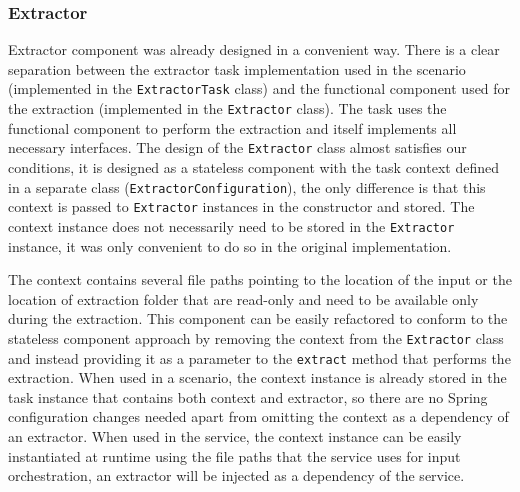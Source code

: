 \subsubsection{Extractor}
Extractor component was already designed in a convenient way. There is a clear separation between the extractor task implementation used in the scenario (implemented in the \texttt{ExtractorTask} class) and the functional component used for the extraction (implemented in the \texttt{Extractor} class). The task uses the functional component to perform the extraction and itself implements all necessary interfaces. The design of the \texttt{Extractor} class almost satisfies our conditions, it is designed as a stateless component with the task context defined in a separate class (\texttt{ExtractorConfiguration}), the only difference is that this context is passed to \texttt{Extractor} instances in the constructor and stored. The context instance does not necessarily need to be stored in the \texttt{Extractor} instance, it was only convenient to do so in the original implementation.
\par
The context contains several file paths pointing to the location of the input or the location of extraction folder that are read-only and need to be available only during the extraction. This component can be easily refactored to conform to the stateless component approach by removing the context from the \texttt{Extractor} class and instead providing it as a parameter to the \texttt{extract} method that performs the extraction. When used in a scenario, the context instance is already stored in the task instance that contains both context and extractor, so there are no Spring configuration changes needed apart from omitting the context as a dependency of an extractor. When used in the service, the context instance can be easily instantiated at runtime using the file paths that the service uses for input orchestration, an extractor will be injected as a dependency of the service.

